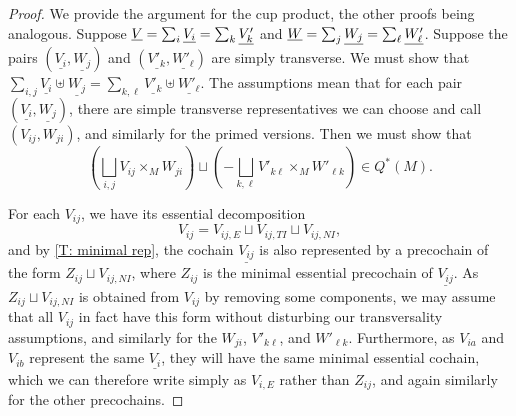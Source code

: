 \begin{proof}
	We provide the argument for the cup product, the other proofs being analogous.
	Suppose $\underline{V} = \sum_i \underline{V_i} = \sum_k \underline{V'_k}$ and $\underline{W} = \sum_j \underline{W_j} = \sum_\ell \underline{W'_\ell}$.
	Suppose the pairs $(\underline{V_i},\underline{W_j})$ and $(\underline{V'_k},\underline{W'_\ell})$ are simply transverse.
	We must show that $\sum_{i,j} \underline{V_i}\uplus \underline{W_j} = \sum_{k,\ell} \underline{V'_k}\uplus \underline{W'_\ell}$.
	The assumptions mean that for each pair $(\underline{V_i},\underline{W_j})$, there are simple transverse representatives we can choose and call $(V_{ij}, W_{ji})$, and similarly for the primed versions.
	Then we must show that $$\left(\bigsqcup_{i,j} V_{ij} \times_M W_{ji}\right) \sqcup \left(-\bigsqcup_{k,\ell} V'_{k\ell} \times_M W'_{\ell k}\right) \in Q^*(M).$$

	For each $V_{ij}$, we have its essential decomposition $$V_{ij} = V_{ij,E} \sqcup V_{ij,TI} \sqcup V_{ij,NI},$$
	and by \cref{T: minimal rep}, the cochain $\underline{V_{ij}}$ is also represented by a precochain of the form $Z_{ij} \sqcup V_{ij,NI}$, where $Z_{ij}$ is the minimal essential precochain of $\underline{V_{ij}}$.
	As $Z_{ij} \sqcup V_{ij,NI}$ is obtained from $V_{ij}$ by removing some components, we may assume that all $V_{ij}$ in fact have this form without disturbing our transversality assumptions, and similarly for the $W_{ji}$, $V'_{k\ell}$, and $W'_{\ell k}$.
	Furthermore, as $V_{ia}$ and $V_{ib}$ represent the same $\underline{V_i}$, they will have the same minimal essential cochain, which we can therefore write simply as $V_{i,E}$ rather than $Z_{ij}$, and again similarly for the other precochains.

\end{proof}
